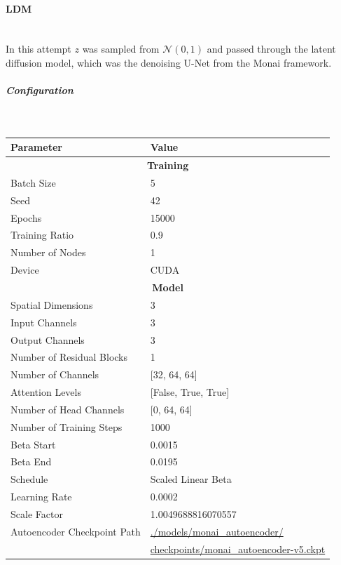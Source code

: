 \newpage
\paragraph{LDM}\mbox{}\\

In this attempt $z$ was sampled from $\mathcal{N}(0,1)$ and passed through the latent diffusion model, which was the denoising U-Net from the Monai framework. 

\subparagraph{Configuration}\mbox{}\\

\begin{table}[H]
\centering
\begin{tabular}{|l|l|}
\hline
\textbf{Parameter} & \textbf{Value} \\
\hline
\multicolumn{2}{|c|}{\textbf{Training}} \\
\hline
Batch Size & 5 \\
\hline
Seed & 42 \\
\hline
Epochs & 15000 \\
\hline
Training Ratio & 0.9 \\
\hline
Number of Nodes & 1 \\
\hline
Device & CUDA \\
\hline
\multicolumn{2}{|c|}{\textbf{Model}} \\
\hline
Spatial Dimensions & 3 \\
\hline
Input Channels & 3 \\
\hline
Output Channels & 3 \\
\hline
Number of Residual Blocks & 1 \\
\hline
Number of Channels & [32, 64, 64] \\
\hline
Attention Levels & [False, True, True] \\
\hline
Number of Head Channels & [0, 64, 64] \\
\hline
Number of Training Steps & 1000 \\
\hline
Beta Start & 0.0015 \\
\hline
Beta End & 0.0195 \\
\hline
Schedule & Scaled Linear Beta \\
\hline
Learning Rate & 0.0002 \\
\hline
Scale Factor & 1.0049688816070557 \\
\hline
Autoencoder Checkpoint Path & \url{./models/monai_autoencoder/}\\ 
& \url{checkpoints/monai_autoencoder-v5.ckpt} \\
\hline

\end{tabular}
\end{table}
